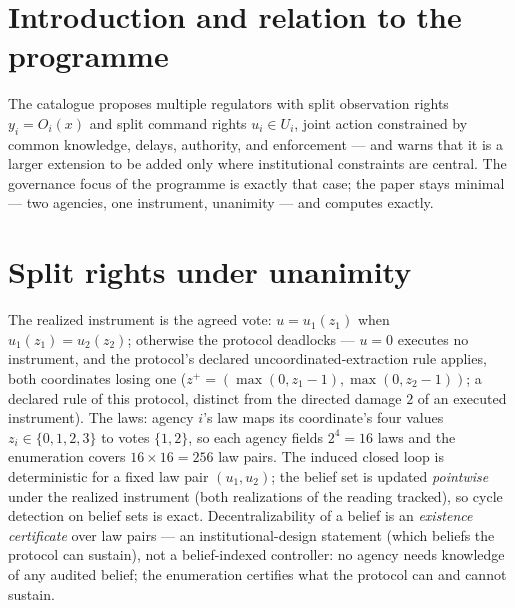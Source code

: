 \documentclass[10pt,twocolumn]{article}
\theoremstyle{definition}
\begin{document}
\section{Introduction and relation to the programme}

The catalogue proposes multiple regulators with split observation rights
$y_i=O_i(x)$ and split command rights $u_i\in U_i$, joint action
constrained by common knowledge, delays, authority, and enforcement ---
and warns that it is a larger extension to be added only where
institutional constraints are central. The governance focus of the
programme is exactly that case; the paper stays minimal --- two agencies,
one instrument, unanimity --- and computes exactly.

\section{Split rights under unanimity}

The realized instrument is the agreed vote: $u=u_1(z_1)$ when
$u_1(z_1)=u_2(z_2)$; otherwise the protocol deadlocks --- $u=0$ executes
no instrument, and the protocol's declared uncoordinated-extraction rule
applies, both coordinates losing one
($z^{+}=(\max(0,z_1-1),\max(0,z_2-1))$; a declared rule of this
protocol, distinct from the directed damage $2$ of an executed
instrument). The laws: agency $i$'s law maps its coordinate's four values
$z_i\in\{0,1,2,3\}$ to votes $\{1,2\}$, so each agency fields
$2^{4}=16$ laws and the enumeration covers $16\times16=256$ law pairs.
The induced closed loop is deterministic for a fixed law pair
$(u_1,u_2)$; the belief set is updated \emph{pointwise} under the
realized instrument (both realizations of the reading tracked), so cycle
detection on belief sets is exact. Decentralizability of a belief is an
\emph{existence certificate} over law pairs --- an institutional-design
statement (which beliefs the protocol can sustain), not a belief-indexed
controller: no agency needs knowledge of any audited belief; the
enumeration certifies what the protocol can and cannot sustain.
\end{document}

